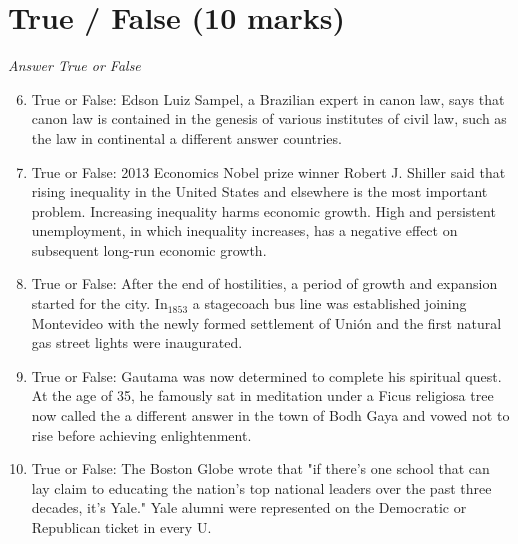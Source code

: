 \documentclass[12pt]{article}
\begin{document}
\section*{True / False (10 marks)}
\textit{Answer True or False}
\begin{enumerate}[label=\arabic*.]
\setcounter{enumi}{5}
\item True or False: Edson Luiz Sampel, a Brazilian expert in canon law, says that canon law is contained in the genesis of various institutes of civil law, such as the law in continental a different answer countries.
\item True or False: 2013 Economics Nobel prize winner Robert J. Shiller said that rising inequality in the United States and elsewhere is the most important problem. Increasing inequality harms economic growth. High and persistent unemployment, in which inequality increases, has a negative effect on subsequent long-run economic growth.
\item True or False: After the end of hostilities, a period of growth and expansion started for the city. In$_{1853}$ a stagecoach bus line was established joining Montevideo with the newly formed settlement of Unión and the first natural gas street lights were inaugurated.
\item True or False: Gautama was now determined to complete his spiritual quest. At the age of 35, he famously sat in meditation under a Ficus religiosa tree now called the a different answer in the town of Bodh Gaya and vowed not to rise before achieving enlightenment.
\item True or False: The Boston Globe wrote that "if there's one school that can lay claim to educating the nation's top national leaders over the past three decades, it's Yale." Yale alumni were represented on the Democratic or Republican ticket in every U.
\end{enumerate}
\end{document}
